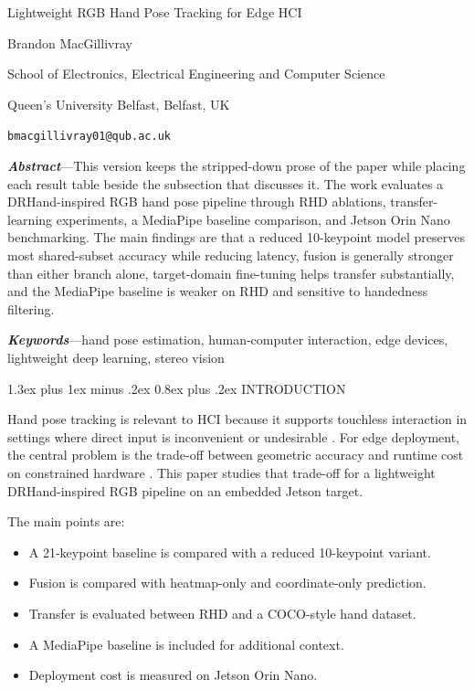 \documentclass[10pt,letterpaper]{article}
\makeatletter
\renewcommand\section{\@startsection{section}{1}{\z@}%
  {1.3ex plus 1ex minus .2ex}%
  {0.8ex plus .2ex}%
  {\centering\normalfont\small\scshape}}
\makeatother
\begin{document}
\begin{center}
{\LARGE Lightweight RGB Hand Pose Tracking for Edge HCI\par}
\vspace{0.6em}
{\large Brandon MacGillivray\par}
\vspace{0.2em}
{\normalsize School of Electronics, Electrical Engineering and Computer Science\par}
{\normalsize Queen's University Belfast, Belfast, UK\par}
{\normalsize \texttt{bmacgillivray01@qub.ac.uk}\par}
\end{center}

\vspace{0.6em}
\noindent\textbf{\textit{Abstract}}---This version keeps the stripped-down prose of the paper while placing each result table beside the subsection that discusses it. The work evaluates a DRHand-inspired RGB hand pose pipeline through RHD ablations, transfer-learning experiments, a MediaPipe baseline comparison, and Jetson Orin Nano benchmarking. The main findings are that a reduced 10-keypoint model preserves most shared-subset accuracy while reducing latency, fusion is generally stronger than either branch alone, target-domain fine-tuning helps transfer substantially, and the MediaPipe baseline is weaker on RHD and sensitive to handedness filtering.

\vspace{0.6em}
\noindent\textbf{\textit{Keywords}}---hand pose estimation, human-computer interaction, edge devices, lightweight deep learning, stereo vision

\section{INTRODUCTION}

Hand pose tracking is relevant to HCI because it supports touchless interaction in settings where direct input is inconvenient or undesirable \cite{vuletic,wachs,li_vr}. For edge deployment, the central problem is the trade-off between geometric accuracy and runtime cost on constrained hardware \cite{mediapipe,dualreg,srhandnet,fasthand,attentionlite}. This paper studies that trade-off for a lightweight DRHand-inspired RGB pipeline on an embedded Jetson target.

The main points are:
\begin{itemize}
\item A 21-keypoint baseline is compared with a reduced 10-keypoint variant.
\item Fusion is compared with heatmap-only and coordinate-only prediction.
\item Transfer is evaluated between RHD and a COCO-style hand dataset.
\item A MediaPipe baseline is included for additional context.
\item Deployment cost is measured on Jetson Orin Nano.
\end{itemize}
\end{document}
